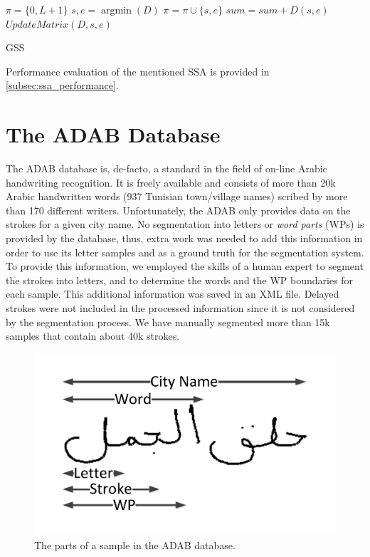 \documentclass[10pt, conference, compsocconf]{IEEEtran}
\begin{document}
\begin{algorithm}
$\pi = \{0,L+1\}$\;
{
	${s,e} = \mathop {\arg \min}(D)$\;
	$\pi = \pi \cup \{s,e\}$\;
	$sum = sum + D(s,e)$\;
	$UpdateMatrix(D,s,e)$\;
}

\caption{GSS}
\label{alg:gss}
\end{algorithm}

Performance evaluation of the mentioned SSA is provided in \ref{subsec:ssa_performance}.


\section{The ADAB Database}
\label{sec:database}
The ADAB database is, de-facto, a standard in the field of on-line Arabic handwriting recognition. It is freely available and consists of more than 20k Arabic handwritten words (937 
Tunisian town/village names) scribed by more than 170 different writers. 
Unfortunately, the ADAB only provides data on the strokes for a given city name. 
No segmentation into letters or \emph{word parts} (WPs) is provided by the database, thus, extra work was needed to add this information in order to use its letter samples and as a ground truth for the segmentation system.
To provide this information, we employed the skills of a human expert to segment the strokes into letters, and to determine the words and the WP boundaries for each sample. 
This additional information was saved in an XML file. Delayed strokes were not included in the processed information since it is not considered by the segmentation process.
We have manually segmented more than 15k samples that contain about 40k strokes. 

\begin{figure}
\centering
\includegraphics[width=0.6\columnwidth]{./figures/sample_parts}
\caption{The parts of a sample in the ADAB database.}
\label{fig:sample_parts}
\end{figure}
\end{document}
